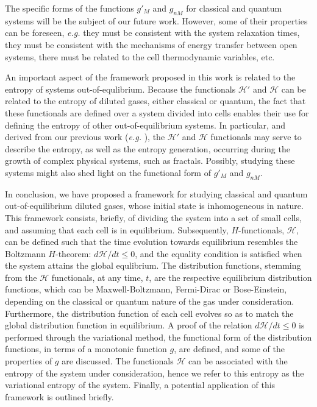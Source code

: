 The specific forms of the functions $g'_M$ and $g_{nM}$ for classical and quantum systems will be the
subject of our future work. However, some of their properties can be foreseen, \textit{e.g.} they must
be consistent with the system relaxation times, they must be consistent with the mechanisms of 
energy transfer between open systems, there must be related to the cell thermodynamic variables, etc.

An important aspect of the framework proposed in this work is related to the entropy of systems
out-of-equlibrium. Because the functionals $\mathcal{H}'$ and $\mathcal{H}$ can be related to
the entropy of diluted gases, either classical or quantum, the fact that these functionals are defined
over a system divided into cells enables their use for defining the entropy
of other out-of-equilibrium systems. In particular, and 
derived from our previous work (\textit{e.g.} \cite{bib:nicolas2020,bib:nicolas2016}), the
$\mathcal H'$ and $\mathcal H$ functionals may serve to describe the entropy,
as well as the entropy generation, occurring during the
growth of complex physical systems, such as fractals. Possibly, studying these systems might also
shed light on the functional form of $g'_M$ and $g_{nM}$.

In conclusion, we have proposed a framework for studying classical and quantum out-of-equilibrium
diluted gases, whose initial
state is inhomogeneous in nature. This framework consists, briefly, of dividing the system into
a set of small cells, and assuming that each cell is in equilibrium. Subsequently,
$H$-functionals, $\mathcal H$, can be defined
such that the time evolution towards equilibrium resembles the Boltzmann $H$-theorem: $d\mathcal H/dt\leq0$,
and the equality condition is satisfied when the system attains the global equlibrium.
The distribution functions,
stemming from the $\mathcal H$ functionals, at any time, $t$, are the respective equilibrium distribution functions,
which can be Maxwell-Boltzmann, Fermi-Dirac or Bose-Einstein, depending on the classical or quantum nature
of the gas under consideration. Furthermore,
the distribution function of each cell evolves so as to match the global distribution function in equilibrium.
A proof of the relation $d\mathcal H/dt\leq0$ is performed through the variational method,
the functional form of the distribution
functions, in terms of a monotonic function $g$, are defined, and some of the properties of $g$ are discussed.
The functionals $\mathcal H$ can be associated with the entropy of the system under consideration, hence we
refer to this entropy as the variational entropy of the system. Finally,
a potential application of this framework is outlined briefly. 



